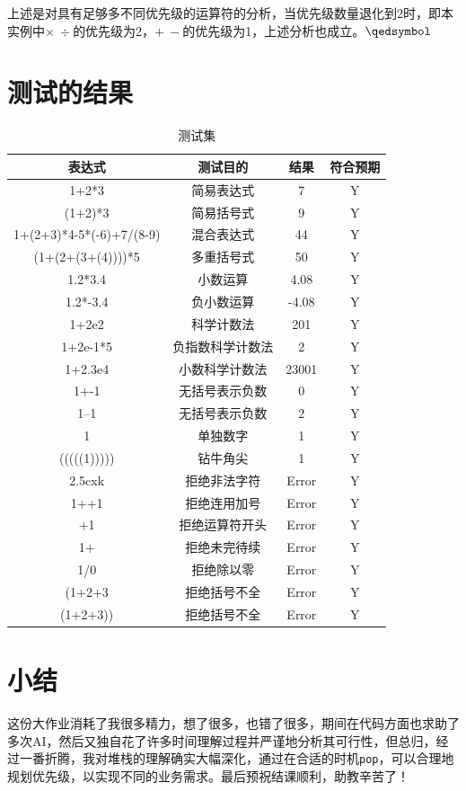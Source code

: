 \documentclass[UTF8]{ctexart}
\begin{document}
上述是对具有足够多不同优先级的运算符的分析，当优先级数量退化到2时，即本实例中$\times\ \div$的优先级为2，$+\ -$的优先级为1，上述分析也成立。$\qedsymbol$ \\

\section{测试的结果}
\begin{table}[ht]
\centering
\begin{tabular}{|c|c|c|c|}  %
\hline  %
表达式 &测试目的& 结果 &符合预期\\  %
\hline
1+2*3 &简易表达式&  7&Y\\  %
\hline
(1+2)*3 &简易括号式&  9&Y\\  %
\hline
 1+(2+3)*4-5*(-6)+7/(8-9) &混合表达式&  44&Y\\
\hline
 (1+(2+(3+(4))))*5 &多重括号式&  50&Y\\
\hline
 1.2*3.4 &小数运算& 4.08&Y\\
\hline
 1.2*-3.4 &负小数运算& -4.08&Y\\
\hline
 1+2e2 &科学计数法& 201&Y\\
\hline
 1+2e-1*5&负指数科学计数法& 2&Y\\
\hline
 1+2.3e4& 小数科学计数法& 23001&Y\\
\hline
 1+-1 &无括号表示负数& 0&Y\\\hline
 1--1&无括号表示负数& 2&Y\\\hline
 1 &单独数字& 1&Y\\\hline
 (((((1))))) &钻牛角尖& 1&Y\\\hline
 2.5cxk&拒绝非法字符& Error&Y\\
\hline
 1++1 &拒绝连用加号& Error&Y\\
\hline
 +1 &拒绝运算符开头& Error&Y\\
\hline
 1+ &拒绝未完待续& Error&Y\\
\hline
 1/0 &拒绝除以零& Error&Y\\
\hline
 (1+2+3 &拒绝括号不全& Error&Y\\
\hline
 (1+2+3))&拒绝括号不全& Error&Y\\
\hline
\end{tabular}
\caption{测试集}
\end{table}


\section{小结}
这份大作业消耗了我很多精力，想了很多，也错了很多，期间在代码方面也求助了多次AI，然后又独自花了许多时间理解过程并严谨地分析其可行性，但总归，经过一番折腾，我对堆栈的理解确实大幅深化，通过在合适的时机\verb|pop|，可以合理地规划优先级，以实现不同的业务需求。最后预祝结课顺利，助教辛苦了！
\end{document}
